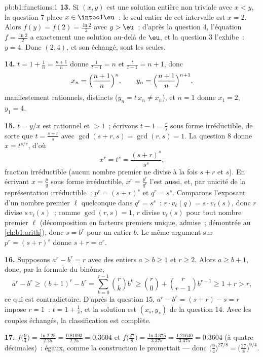 \begin{solution}{pb:b1:functions:1}
\textbf{13.} Si $(x, y)$ est une solution entière non triviale avec
$x < y$, la question 7 place $x \in \intoo1\eu$~: le seul entier de
cet intervalle est $x = 2$. Alors $f(y) = f(2) = \frac{\ln2}2$ avec
$y > \eu$~; d'après la question 4, l'équation $f = \frac{\ln2}2$ a
exactement une solution au-delà de $\eu$, et la question 3 l'exhibe~:
$y = 4$. Donc $(2, 4)$, et son échangé, sont les seules.

\textbf{14.} $t = 1 + \frac1n = \frac{n+1}n$ donne $\frac1{t - 1}
= n$ et $\frac t{t-1} = n + 1$, donc
\[
x_n = \Bigl(\frac{n+1}n\Bigr)^{n},
\qquad
y_n = \Bigl(\frac{n+1}n\Bigr)^{n+1},
\]
manifestement rationnels, distincts ($y_n = t\,x_n \neq x_n$), et
$n = 1$ donne $x_1 = 2$, $y_1 = 4$.

\textbf{15.} $t = y/x$ est rationnel et $> 1$~; écrivons $t - 1 =
\frac rs$ sous forme irréductible, de sorte que $t = \frac{s + r}s$
avec $\gcd(s + r, s) = \gcd(r, s) = 1$. La question 8 donne
$x = t^{s/r}$, d'où
\[
x^r = t^s = \frac{(s+r)^s}{s^s} ,
\]
fraction irréductible (aucun nombre premier ne divise à la fois
$s + r$ et $s$). En écrivant $x = \frac pq$ sous forme irréductible,
$x^r = \frac{p^r}{q^r}$ l'est aussi, et, par unicité de la
représentation irréductible~: $p^r = (s+r)^s$ et $q^r = s^s$.
Comparons l'exposant d'un nombre premier $\ell$ quelconque dans
$q^r = s^s$~: $r \cdot v_\ell(q) = s \cdot v_\ell(s)$, donc $r$
divise $s\,v_\ell(s)$~; comme $\gcd(r, s) = 1$, $r$ divise
$v_\ell(s)$ pour tout nombre premier $\ell$ (décomposition en
facteurs premiers unique, admise~; démontrée au \cref{ch:b1:arith}),
donc $s = b^r$ pour un entier $b$. Le même argument sur
$p^r = (s+r)^s$ donne $s + r = a^r$.

\textbf{16.} Supposons $a^r - b^r = r$ avec des entiers $a > b \geq 1$
et $r \geq 2$. Alors $a \geq b + 1$, donc, par la formule du binôme,
\[
a^r - b^r \geq (b+1)^r - b^r
= \sum_{k=0}^{r-1}\binom rk b^k
\geq \binom r0 + \binom r{r-1} b^{r-1}
\geq 1 + r > r ,
\]
ce qui est contradictoire. D'après la question 15, $a^r - b^r =
(s + r) - s = r$ impose $r = 1$~: $t = 1 + \frac1s$, et la solution
est $(x_s, y_s)$ de la question 14. Avec les couples échangés, la
classification est complète.

\textbf{17.} $f\bigl(\tfrac94\bigr) = \frac{\ln 2.25}{2.25} =
\frac{0.81093}{2.25} = 0.3604$ et $f\bigl(\tfrac{27}8\bigr) =
\frac{\ln 3.375}{3.375} = \frac{1.21640}{3.375} = 0.3604$ (à quatre
décimales)~: égaux, comme la construction le promettait --- donc
$\bigl(\tfrac94\bigr)^{27/8} = \bigl(\tfrac{27}8\bigr)^{9/4}$.


\end{solution}
